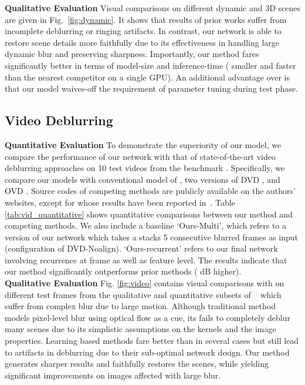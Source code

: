 \documentclass[10pt,twocolumn,letterpaper]{article}
\begin{document}
\noindent \textbf{Qualitative Evaluation}
Visual comparisons on different dynamic and 3D scenes are given in Fig.~\ref{fig:dynamic}. It shows that results of prior works suffer from incomplete deblurring or ringing artifacts. In contrast, our network is able to restore scene details more faithfully due to its effectiveness in handling large dynamic blur and preserving sharpness. Importantly, our method fares significantly better in terms of model-size and inference-time ( smaller and  faster than the nearest competitor \cite{tao2018scale} on a single GPU). An additional advantage over \cite{xu2013unnatural,whyte2012non} is that our model waives-off the requirement of parameter tuning during test phase.



\subsection{Video Deblurring}

\noindent \textbf{Quantitative Evaluation}
To demonstrate the superiority of our model, we compare  the  performance of our network with that of state-of-the-art video deblurring approaches on 10 test videos from the benchmark \cite{su2017deep}. Specifically, we  compare  our  models with conventional model of \cite{delbracio2015hand}, two versions of DVD \cite{su2017deep}, and OVD \cite{hyun2017online}. Source codes of competing methods are publicly available on the authors' websites, except for \cite{delbracio2015hand} whose results have been reported in~\cite{su2017deep}. Table \ref{tab:vid_quantitative} shows quantitative comparisons between our method and competing methods. We also include a baseline `Ours-Multi', which refers to a version of our network which takes a stacks 5 consecutive blurred frames as input (configuration of DVD-Noalign). `Ours-recurrent' refers to our final network involving recurrence at frame as well as feature level. The results indicate that our method significantly outperforms prior methods ( dB higher).
\\
\textbf{Qualitative Evaluation}
Fig. \ref{fig:video} contains visual comparisons with \cite{hyun2015generalized,su2017deep,hyun2017online} on different test frames from the qualitative and quantitative subsets of ~\cite{su2017deep} which suffer from complex blur due to large motion. Although traditional method \cite{hyun2015generalized} models pixel-level blur using optical flow as a cue, its fails to completely deblur many scenes due to its simplistic assumptions on the kernels and the image properties. Learning based methods \cite{su2017deep,hyun2017online} fare better than \cite{hyun2015generalized} in several cases but still lead to artifacts in deblurring due to their sub-optimal network design. Our method generates sharper results and faithfully restores the scenes, while yielding significant improvements on images affected with large blur.
\end{document}

